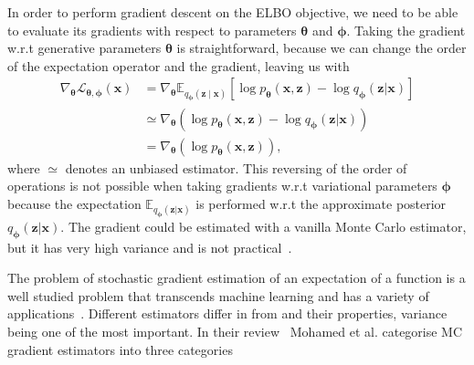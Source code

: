 In order to perform gradient descent on the ELBO objective, we need to be able to evaluate its gradients with respect to parameters $\boldsymbol{\theta}$ and $\boldsymbol{\phi}$. Taking the gradient w.r.t generative parameters $\boldsymbol{\theta}$ is straightforward, because we can change the order of the expectation operator and the gradient, leaving us with
\begin{equation}
\begin{aligned} 
\nabla_{\boldsymbol{\theta}} \mathcal{L}_{\boldsymbol{\theta}, \boldsymbol{\phi}}(\mathbf{x}) &=\nabla_{\boldsymbol{\theta}} 	\mathbb{E}_{q_{\boldsymbol{\phi}}(\mathbf{z} \mid \mathbf{x})}\left[\log p_{\boldsymbol{\theta}}(\mathbf{x}, \mathbf{z})-\log q_{\boldsymbol{\phi}}(\mathbf{z} | \mathbf{x})\right] \\  & \simeq \nabla_{\boldsymbol{\theta}}\left(\log p_{\boldsymbol{\theta}}(\mathbf{x}, \mathbf{z})-\log q_{\boldsymbol{\phi}}(\mathbf{z} | \mathbf{x})\right) \\ &=\nabla_{\boldsymbol{\theta}}\left(\log p_{\boldsymbol{\theta}}(\mathbf{x}, \mathbf{z})\right) ,
\end{aligned}
\end{equation}
where $\simeq$ denotes an unbiased estimator. This reversing of the order of operations is not possible when taking gradients w.r.t variational parameters $\boldsymbol{\phi}$ because the expectation $\mathbb{E}_{q_{\boldsymbol{\phi}}(\mathbf{z} | \mathbf{x})}$ is performed w.r.t the approximate posterior $q_{\boldsymbol{\phi}}(\mathbf{z} | \mathbf{x})$. The gradient could be estimated with a vanilla Monte Carlo estimator, but it has very high variance and is not practical~\cite{kingma2013auto}. 

The problem of stochastic gradient estimation of an expectation of a function is a well studied problem that transcends machine learning and has a variety of applications~\cite{chriss1997black, schrittwieser2020mastering}. Different estimators differ in from and their properties, variance being one of the most important. In their review~\cite{mohamed2020monte} Mohamed et al. categorise MC gradient estimators into three categories


